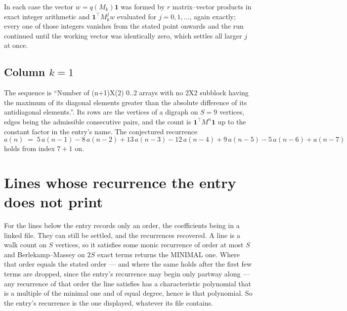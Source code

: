 \documentclass[11pt,a4paper]{article}
\theoremstyle{plain}
\theoremstyle{definition}
\begin{document}
In each case the vector $w=q(M_k)\mathbf{1}$ was formed by $r$ matrix--vector products in
exact integer arithmetic and $\mathbf{1}^{\!\top}M_k^{j}w$ evaluated for $j=0,1,\dots$,
again exactly; every one of those integers vanishes from the stated point onwards and the run
continued until the working vector was identically zero, which settles all larger $j$ at once.

\subsection*{Column $k$$=1$}
The sequence is ``Number of (n+1)X(2) 0..2 arrays with no 2X2 subblock having the maximum of its diagonal elements greater than the absolute difference of its antidiagonal elements.''. Its rows are the vertices of a digraph on
$S=9$ vertices, edges being the admissible consecutive pairs, and the count is
$\mathbf{1}^{\!\top}M^{n}\mathbf{1}$ up to the constant factor in the entry's name.
The conjectured recurrence
\[
a(n)\;=\;5\,a(n-1) - 8\,a(n-2) + 13\,a(n-3) - 12\,a(n-4) + 9\,a(n-5) - 5\,a(n-6) + a(n-7)
\]
holds from index $7+1$ on.


\section{Lines whose recurrence the entry does not print}

For the lines below the entry records only an order, the coefficients being in a linked file.
They can still be settled, and the recurrences recovered. A line is a walk count on $S$
vertices, so it satisfies some monic recurrence of order at most $S$ and Berlekamp--Massey on
$2S$ exact terms returns the MINIMAL one. Where that order equals the stated order --- and
where the same holds after the first few terms are dropped, since the entry's recurrence may
begin only partway along --- any recurrence of that order the line satisfies has a
characteristic polynomial that is a multiple of the minimal one and of equal degree, hence is
that polynomial. So the entry's recurrence is the one displayed, whatever its file contains.
\end{document}
